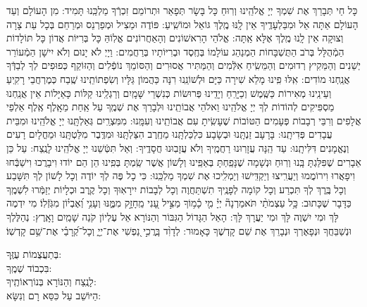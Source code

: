 \documentclass[twoside, openany, parskip=half, 11pt]{book}
\begin{document}
\label{nishmas}
 כָּל חַי תְּבָרֵךְ אֶת שִׁמְךָ יְיָ אֱלֹהֵֽינוּ וְרֽוּחַ כָּל בָּשָׂר תְּפָאֵר וּתְרוֹמֵם זִכְרְֿךָ מַלְכֵּֽנוּ תָּמִיד: מִן הָעוֹלָם וְעַד הָעוֹלָם אַתָּה אֵל וּמִבַּלְעָדֶֽיךָ אֵין לָֽנּוּ מֶֽלֶךְ גּוֹאֵל וּמוֹשִֽׁיעַ: 
פּוֹדֶה וּמַצִיל וּמְפַרְנֵס וּמְרַחֵם בְּכָל עֵת צָרָה וְצוּקָה אֵין לָֽנוּ מֶֽלֶךְ אֶלָּא אַֽתָּה: אֱלֹהֵי הָרִאשׁוֹנִים וְהָאַחֲרוֹנִים אֱלֽוֹהַּ כָּל בְּרִיּוֹת אֲדוֹן כָּל תּוֹלָדוֹת הַמְֿהֻלָּל בְּרֹב הַתֻּשְׁבָּחוֹת הַמְנַהֵג עוֹלָמוֹ בְּחֶֽסֶד וּבְרִיּוֹתָיו בְּרַחֲמִים: וַיָיְ לֹא יָנוּם וְלֹא יִישָׁן הַמְֿעוֹרֵר יְשֵׁנִים וְהַמֵּקִיץ רְדוּמִים וְהַמֵּשִֽׂיחַ אִלְּֿמִים וְהַמַּתִּיר אֲסוּרִים וְהַסּוֹמֵךְ נוֹפְֿלִים וְהַזּוֹקֵף כְּפוּפִים לְךָ לְבַדְּֿךָ אֲנַֽחְנוּ מוֹדִים: אִֽלּוּ פִֽינוּ מָלֵא שִׁירָה כַּיָּם וּלְשׁוֹנֵֽנוּ רִנָּה כַּהֲמוֹן גַּלָּיו וְשִׂפְתוֹתֵֽינוּ שֶֽׁבַח כְּמֶרְחֲבֵי רָקִֽיעַ וְעֵינֵֽינוּ מְאִירוֹת כַּשֶּֽׁמֶשׁ וְכַיָּרֵֽחַ וְיָדֵֽינוּ פְּרוּשׂוֹת כְּנִשְׁרֵי שָּׁמָֽיִם וְרַגְלֵֽינוּ קַלּוֹת כָּאַיָּלוֹת אֵין אֲנַֽחְנוּ מַסְפִּיקִים לְהוֹדוֹת לְךָ יְיָ אֱלֹהֵֽינוּ וֵאלֹהֵי אֲבוֹתֵֽינוּ וּלְבָרֵךְ אֶת שְׁמֶֽךָ עַל אַֽחַת מֵאָֽלֶף אֶֽלֶף אַלְפֵי אֲלָפִים וְרִבֵּי רְבָבוֹת פְּעָמִים הַטּוֹבוֹת שֶׁעָשִֽׂיתָ עִם אֲבוֹתֵֽינוּ וְעִמָּֽנוּ: מִמִּצְרַֽיִם גְּאַלְתָּֽנוּ יְיָ אֱלֹהֵֽינוּ וּמִבֵּית עֲבָדִים פְּדִיתָֽנוּ: בָּרָעָב זַנְתָּֽנוּ וּבְשָׂבָע כִּלְכַּלְתָּֽנוּ מֵחֶֽרֶב הִצַּלְתָּֽנּוּ וּמִדֶּֽבֶר מִלַּטְתָּֽנוּ וּמֵחֳלָיִם רָעִים וְנֶאֱמָנִים דִּלִּיתָֽנוּ: עַד הֵֽנָּה עֲזָרֽוּנוּ רַחֲמֶֽיךָ וְלֹא עֲזָבֽוּנוּ חֲסָדֶֽיךָ: וְאַל תִּטְּֿשֵׁנוּ יְיָ אֱלֹהֵֽינוּ לָנֶֽצַח: עַל כֵּן אֵבָרִים שֶׁפִּלַּגְתָּ בָּֽנוּ וְרֽוּחַ וּנְשָׁמָה שֶׁנָּפַֽחְתָּ בְּאַפֵּֽינוּ וְלָשׁוֹן אֲשֶׁר שַֽׂמְתָּ בְּפִֽינוּ הֵן הֵם יוֹדוּ וִיבָרֲכוּ וִישַׁבְּֿחוּ וִיפָאֲרוּ וִירוֹמֲמוּ וְיַעֲרִֽיצוּ וְיַקְדִּֽישׁוּ וְיַמְלִֽיכוּ אֶת שִׁמְךָ מַלְכֵּֽנוּ: כִּי כָל פֶּה לְךָ יוֹדֶה וְכָל לָשׁוֹן לְךָ תִּשָּׁבַע וְכָל בֶּֽרֶךְ לְךָ תִּכְרַע וְכָל קוֹמָה לְפָנֶֽיךָ תִשְׁתַּחֲוֶה וְכָל לְבָבוֹת יִירָאֽוּךָ וְכָל קֶֽרֶב וּכְלָיוֹת יְזַמְּֿרוּ לִשְׁמֶֽךָ כַּדָּבָר שֶׁכָּתוּב:
 כָּ֥ל עַצְמֹתַ֨י תֹּאמַרְנָה֘ יְיָ֗ מִ֤י כָ֫מ֥וֹךָ מַצִּ֣יל עָ֭נִי מֵֽחָזָ֣ק מִמֶּ֑נּוּ וְעָנִ֥י וְ֝אֶבְי֗וֹן מִגֹּֽזְֿלֽוֹ׃ מִי יִדְמֶה לָּךְ וּמִי יִשְׁוֶה לָּךְ וּמִי יַעֲרָךְ לָּךְ: הָאֵל הַגָּדוֹל הַגִּבּוֹר וְהַנּוֹרָא אֵל עֶלְיוֹן קֹנֵה שָׁמַֽיִם וָאָֽרֶץ:
  נְהַלֶּלְךָ וּנְשַׁבֵּחֲךָ וּנְפָאֶרְךָ וּנְבָרֵךְ אֶת שֵׁם קָדְשֶׁךָ כָּאָמוּר:
 לְדָוִ֨ד בָּֽרֲכִ֣י נַ֭פְשִׁי אֶת־יְיָ֑ וְכָל־קְ֝רָבַ֗י אֶת־שֵׁ֥ם קָדְשֽׁוֹ׃
 

 בְּתַעֲצֻמוֹת עֻזֶּֽךָ:\\
 בִּכְבוֹד שְׁמֶֽךָ:\\ 
 לָנֶֽצַח וְהַנּוֹרָא בְּנוֹרְאוֹתֶֽיךָ:\\
 הַיּוֹשֵׁב עַל כִּסֵּא רָם וְנִשָּׂא:
\end{document}

